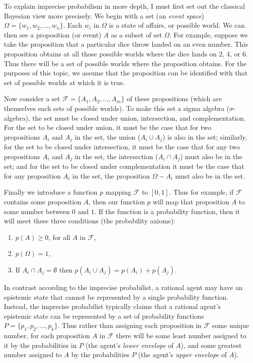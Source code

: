 To explain imprecise probabilism in more depth, I must first set out the classical Bayesian view more precisely. We begin with a set (an \textit{event space}) $\Omega = \{w_1, w_2, \ldots, w_n\}$. Each $w_i$ in $\Omega$ is a state of affairs, or possible world. We can then see a proposition (or event) $A$ as a subset of set $\Omega$. For example, suppose we take the proposition that a particular dice throw landed on an even number. This proposition obtains at all those possible worlds where the dice lands on 2, 4, or 6. Thus there will be a set of possible worlds where the proposition obtains. For the purposes of this topic, we assume that the proposition can be identified with that set of possible worlds at which it is true. 

Now consider a set $\mathcal{F} = \{A_1, A_2, \ldots, A_m\}$ of these propositions (which are themselves each sets of possible worlds). To make this set a sigma algebra ($\sigma$-algebra), the set must be closed under  union, intersection, and complementation.  For the set to be closed under union, it must be the case that for two propositions $A_i$ and $A_j$ in the set, the union ($A_i \cup A_j$) is also in the set; similarly, for the set to be closed under intersection, it must be the case that for any two propositions $A_i$ and $A_j$ in the set, the intersection ($A_i \cap A_j$) must also be in the set; and for the set to be closed under complementation it must be the case that for any proposition $A_i$ in the set, the proposition $\Omega - A_i$ must also be in the set.

Finally we introduce a  function $p$ mapping $\mathcal{F}$ to $[0,1]$. Thus for example, if $\mathcal{F}$ contains some proposition $A$, then our function $p$ will map that proposition $A$ to some number between $0$ and $1$. If the function is a probability function, then it will meet these three conditions (the probability axioms): 
\begin{enumerate}  
\item $p(A) \geq 0$, for all $A$ in $\mathcal{F}$,
\item $p(\Omega) = 1$,
\item If $A_i \cap A_j = \emptyset$ then $p(A_i \cup A_j) = p(A_i) + p(A_j)$.
\end{enumerate}

In contrast according to the imprecise probabilist, a rational agent may have an epistemic state that cannot be represented by a  single probability function. Instead, the imprecise probabilist typically claims that a rational agent's epistemic state can be represented by a set of probability functions $P = \{p_1, p_2, \ldots, p_k\}$. Thus rather than assigning each proposition in $\mathcal{F}$ some unique number, for each proposition $A$ in $\mathcal{F}$ there will be some least number assigned to it by the probabilities in $P$ (the agent's \textit{lower envelope} of $A$), and some greatest number assigned to $A$ by the probabilities $P$ (the agent's \textit{upper envelope} of $A$).

